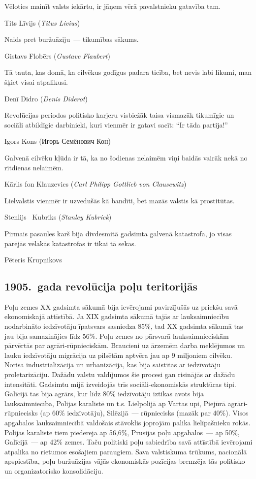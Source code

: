 \documentclass[twoside,a5paper,12pt,fleqn,openany]{extbook}
\newcommand{\rutxti}[1]{\textrussian{#1}}
\newcommand{\detxti}[1]{\textit{\textgerman{#1}}}
\newcommand{\frtxti}[1]{\textit{\textfrench{#1}}}
\newcommand{\entxti}[1]{\textit{\textenglish{#1}}}
\newcommand{\latxti}[1]{\textit{\textlatin{#1}}}
\begin{document}
\epigraph
{Vēloties mainīt valsts iekārtu, ir jāņem vērā pavalstnieku gatavība tam.}
{Tits Līvijs (\latxti{Titus Livius})}

\epigraph
{Naids pret buržuāziju~--- tikumības sākums.}
{Gistavs Flobērs (\frtxti{Gustave Flaubert})}

\epigraph
{Tā tauta, kas domā, ka cilvēkus godīgus padara ticība, bet nevis labi likumi, man šķiet visai atpalikusi.}
{Denī Didro (\frtxti{Denis Diderot})}

\epigraph
{Revolūcijas periodos politisko karjeru visbiežāk taisa vismazāk tikumīgie un sociāli atbildīgie darbinieki, kuri vienmēr ir gatavi sacīt: ``Ir tāda partija!''}
{Igors Kons (\rutxti{Игорь Семёнович Кон})}

\epigraph
{Galvenā cilvēku kļūda ir tā, ka no šodienas nelaimēm viņi baidās vairāk nekā no rītdienas nelaimēm.}
{Kārlis fon Klauzevics (\detxti{Carl Philipp Gottlieb von Clausewitz})}

\epigraph
{Lielvalstis vienmēr ir uzvedušās kā bandīti, bet mazās valstis kā prostitūtas.}
{Stenlijs ~Kubriks (\entxti{Stanley Kubrick})}

\epigraph
{Pirmais pasaules karš bija divdesmitā gadsimta galvenā katastrofa, jo visas pārējās vēlākās katastrofas ir tikai tā sekas.}
{Pēteris Krupņikovs}

\subsection{1905.~gada revolūcija poļu teritorijās}



Poļu zemes XX gadsimta sākumā bija ievērojami pavirzījušās uz priekšu savā ekonomiskajā attīstībā. Ja XIX gadsimta sākumā tajās ar lauksaimniecību nodarbināto iedzīvotāju īpatsvars sasniedza 85\%, tad XX gadsimta sākumā tas jau bija samazinājies līdz 56\%. Poļu zemes no pārsvarā lauksaimnieciskām pārvērtās par agrāri-rūpnieciskām. Braucieni uz ārzemēm darba meklējumos un lauku iedzīvotāju migrācija uz pilsētām aptvēra jau ap 9 miljoniem cilvēku. Norisa industrializācija un urbanizācija, kas bija saistītas ar iedzīvotāju proletarizāciju. Dažādu valstu valdījumos šie procesi gan risinājās ar dažādu intensitāti. Gadsimtu mijā izveidojās trīs sociāli-ekonomiskās struktūras tipi. Galīcijā tas bija agrārs, kur līdz 80\% iedzīvotāju iztikas avots bija lauksaimniecība, Polijas karalistē un t.s. Lielpolijā ap Vartas upi, Piejūrā agrāri-rūpniecisks (ap 60\% iedzīvotāju), Silēzijā~--- rūpniecisks (mazāk par 40\%). Visos apgabalos lauksaimniecībā valdošais stāvoklis joprojām palika lielīpašnieku rokās. Polijas karalistē tiem piederēja ap 56,6\%, Prūsijas poļu apgabalos~--- ap 50\%, Galīcijā~--- ap 42\% zemes. Taču politiski poļu sabiedrība savā attīstībā ievērojami atpalika no rietumos esošajiem paraugiem. Sava valstiskuma trūkums, nacionālā apspiestība, poļu buržuāzijas vājās ekonomiskās pozīcijas bremzēja tās politisko un organizatorisko konsolidāciju.
\end{document}
